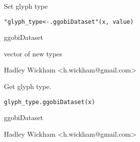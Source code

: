 \documentclass{article}
\begin{document}
\begin{Description}\relax
Set glyph type
\end{Description}
\begin{Usage}
\begin{verbatim}"glyph_type<-.ggobiDataset"(x, value)\end{verbatim}
\end{Usage}
\begin{Arguments}
\begin{ldescription}
\item[\code{x}] ggobiDataset
\item[\code{value}] vector of new types
\end{ldescription}
\end{Arguments}
\begin{Details}\relax
\end{Details}
\begin{Author}\relax
Hadley Wickham <h.wickham@gmail.com>
\end{Author}
\begin{SeeAlso}\relax
{}
\end{SeeAlso}
\begin{Examples}
\begin{ExampleCode}\end{ExampleCode}
\end{Examples}

\begin{Description}\relax
Get glyph type.
\end{Description}
\begin{Usage}
\begin{verbatim}glyph_type.ggobiDataset(x)\end{verbatim}
\end{Usage}
\begin{Arguments}
\begin{ldescription}
\item[\code{x}] ggobiDataset
\end{ldescription}
\end{Arguments}
\begin{Details}\relax
\end{Details}
\begin{Author}\relax
Hadley Wickham <h.wickham@gmail.com>
\end{Author}
\begin{SeeAlso}\relax
{}
\end{SeeAlso}
\begin{Examples}
\begin{ExampleCode}\end{ExampleCode}
\end{Examples}
\end{document}
